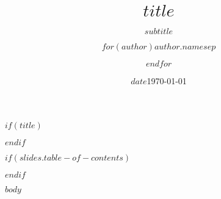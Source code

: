 \documentclass[aspectratio=$if(slides.aspect-ratio)$$slides.aspect-ratio$$else$169$endif$,$if(slides.font-size)$$slides.font-size$$else$10pt$endif$]{beamer}
\title{$title$}
\subtitle{$subtitle$}
\date{$date$}
\date{\today}
\author{$for(author)$$author.name$$sep$ \and $endfor$}
\institute{$institute$}
\begin{document}
$if(title)$
\begin{frame}
    \titlepage
\end{frame}
$endif$

$if(slides.table-of-contents)$
\begin{frame}
    \tableofcontents
\end{frame}
$endif$

$body$
\end{document}
